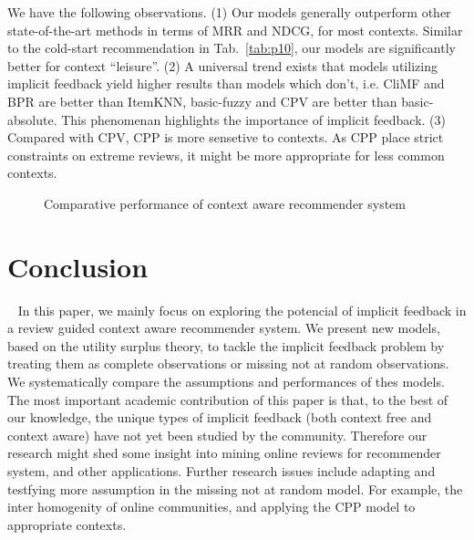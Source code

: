 \documentclass[sigconf]{acmart}
\begin{document}
We have the following observations. (1) Our models generally outperform other state-of-the-art methods in terms of MRR and NDCG, for most contexts. Similar to the cold-start recommendation in Tab.~\ref{tab:p10}, our models are significantly better for context ``leisure''. (2) A universal trend exists that models utilizing implicit feedback yield higher results than models which don't, i.e. CliMF and BPR are better than ItemKNN, basic-fuzzy and CPV are better than basic-absolute. This phenomenan highlights the importance of implicit feedback. (3) Compared with CPV, CPP is more sensetive to contexts. As CPP place strict constraints on extreme reviews, it might be more appropriate for less common contexts.   

\begin{figure}[!hbp]
\centering
{}
\hspace{0pt}
\vspace{0pt}
\caption{Comparative performance of context aware recommender system}
\end{figure}

\section{Conclusion}~\label{sec:con}
In this paper, we mainly focus on exploring the potencial of implicit feedback in a review guided context aware recommender system. We present new models, based on the utility surplus theory,  to tackle the implicit feedback problem by treating them as complete observations or missing not at random observations. We systematically compare the assumptions and performances of thes models.
The most important academic contribution of this paper is that, to the best of our
knowledge, the unique types of implicit feedback (both context free and context aware) have not yet been studied by the community. Therefore our research might shed some insight into mining online reviews for recommender system, and other applications.
Further research issues include adapting and testfying more assumption in the missing not at random model. 
For example, the inter homogenity of online communities, and applying the CPP model to appropriate contexts. 
\end{document}
